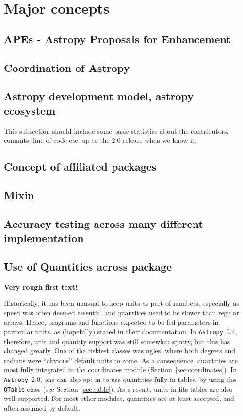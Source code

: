 \documentclass[modern]{aastex61}
\newcommand{\package}[1]{\texttt{#1}}
\newcommand{\astropypkg}{\package{Astropy}}
\newcommand{\sectionname}{Section}
\begin{document}
\section{Major concepts}
\label{sec:concepts}
\subsection{APEs - Astropy Proposals for Enhancement}

\subsection{Coordination of Astropy}

\subsection{Astropy development model, astropy ecosystem}
This subsection should include some basic statistics about the contributors, commits, line of code etc. up to the 2.0 release when we know it.

\subsection{Concept of affiliated packages}

\subsection{Mixin}

\subsection{Accuracy testing across many different implementation}

\subsection{Use of Quantities across package}

{\bf Very rough first text!}

Historically, it has been unusual to keep units as part of numbers, especially as speed was often deemed essential and quantities used to be slower than regular arrays. Hence, programs and functions expected to be fed parameters in particular units, as (hopefully) stated in their documentation.  In \astropypkg\ 0.4, therefore, unit and quantity support was still somewhat spotty, but this has changed greatly.  One of the riskiest classes was ngles, where both degrees and radians were ``obvious'' default units to some. As a consequence, quantities are most fully integrated in the coordinates module (\sectionname~\ref{sec:coordinates}). In \astropypkg\ 2.0, one can also opt in to use quantities fully in tables, by using the {\tt QTable} class (see \sectionname~\ref{sec:table}). As a result, units in fits tables are also well-supported. For most other modules, quantities are at least accepted, and often assumed by default.
\end{document}
